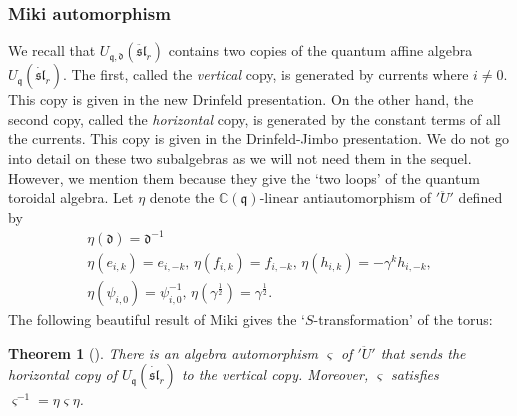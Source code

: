 \documentclass{amsart}
\newcommand{\C}{\mathbb{C}}
\newcommand{\qqq}{\mathfrak{q}}
\newcommand{\ddd}{\mathfrak{d}}
\newtheorem{thm}{Theorem}
\theoremstyle{remark}
\numberwithin{thm}{section}
\numberwithin{equation}{section}
\begin{document}
\subsubsection{Miki automorphism}\label{MikiAut}
%
We recall that $U_{\qqq,\ddd}(\ddot{\mathfrak{sl}}_r)$ contains two copies of the quantum affine algebra $U_{\qqq}(\dot{\mathfrak{sl}}_r)$.
The first, called the \textit{vertical} copy, is generated by currents where $i\not=0$.
This copy is given in the new Drinfeld presentation.
On the other hand, the second copy, called the \textit{horizontal} copy, is generated by the constant terms of all the currents.
This copy is given in the Drinfeld-Jimbo presentation.
We do not go into detail on these two subalgebras as we will not need them in the sequel.
However, we mention them because they give the `two loops' of the quantum toroidal algebra.
Let $\eta$ denote the $\C(\qqq)$-linear antiautomorphism of $'\ddot{U}'$ defined by
\begin{equation}
\begin{gathered}
    \eta(\ddd)=\ddd^{-1}\\
\eta(e_{i,k})=e_{i,-k},\, \eta(f_{i,k})=f_{i,-k},\, \eta(h_{i,k})=-\gamma^kh_{i,-k},\\
\eta(\psi_{i,0})=\psi_{i,0}^{-1},\,\eta(\gamma^{\frac{1}{2}})=\gamma^{\frac{1}{2}}.
\end{gathered}
\label{EtaDef}
\end{equation}
The following beautiful result of Miki gives the `$S$-transformation' of the torus:
\begin{thm}[\cite{Miki}]\label{MikiAutThm}
There is an algebra automorphism $\varsigma$ of $'\ddot{U}'$ that sends the horizontal copy of $U_{\qqq}(\dot{\mathfrak{sl}}_r)$ to the vertical copy. 
Moreover, $\varsigma$ satisfies $\varsigma^{-1}=\eta\varsigma\eta$.
\end{thm}
\end{document}
